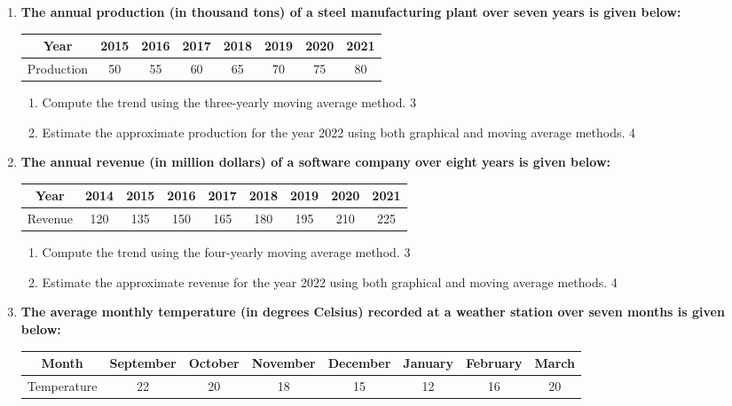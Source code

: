 \documentclass[a4paper,oneside]{book}
\begin{document}
\begin{enumerate}
  \item
\textbf{The annual production (in thousand tons) of a steel manufacturing plant over seven years is given below:}

\begin{table}[h]
\centering
\begin{tabular}{cccccccc}
Year     & 2015 & 2016 & 2017 & 2018 & 2019 & 2020 & 2021 \\ \hline
Production & 50   & 55   & 60   & 65   & 70   & 75   & 80   
\end{tabular}
\end{table}

\begin{enumerate}
    \item  
    Compute the trend using the three-yearly moving average method. \hfill 3
    \item
    Estimate the approximate production for the year 2022 using both graphical and moving average methods. \hfill 4
\end{enumerate}

\item
\textbf{The annual revenue (in million dollars) of a software company over eight years is given below:}

\begin{table}[h]
\centering
\begin{tabular}{ccccccccc}
Year & 2014 & 2015 & 2016 & 2017 & 2018 & 2019 & 2020 & 2021 \\ \hline
Revenue & 120 & 135 & 150 & 165 & 180 & 195 & 210 & 225
\end{tabular}
\end{table}

\begin{enumerate}
\item
Compute the trend using the four-yearly moving average method. \hfill 3
\item
Estimate the approximate revenue for the year 2022 using both graphical and moving average methods. \hfill 4
\end{enumerate}

\item
\textbf{The average monthly temperature (in degrees Celsius) recorded at a weather station over seven months is given below:}

\begin{table}[H]
\centering
\begin{tabular}{c|c|c|c|c|c|c|c}
Month & September & October & November & December & January & February & March \\ \hline
Temperature & 22 & 20 & 18 & 15 & 12 & 16 & 20
\end{tabular}
\end{table}


\end{enumerate}
\end{document}
